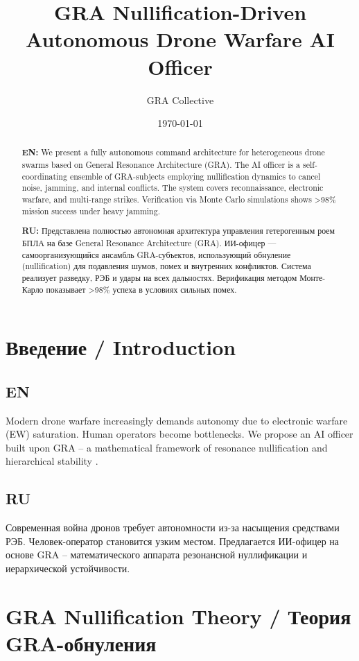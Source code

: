 \documentclass[a4paper,12pt]{article}
\title{GRA Nullification-Driven Autonomous Drone Warfare AI Officer}
\author{GRA Collective}
\date{\today}
\begin{document}
\maketitle

\begin{abstract}
\noindent\textbf{EN:} We present a fully autonomous command architecture for heterogeneous drone swarms based on General Resonance Architecture (GRA). The AI officer is a self-coordinating ensemble of GRA-subjects employing nullification dynamics to cancel noise, jamming, and internal conflicts. The system covers reconnaissance, electronic warfare, and multi-range strikes. Verification via Monte Carlo simulations shows >98\% mission success under heavy jamming.

\noindent\textbf{RU:} Представлена полностью автономная архитектура управления гетерогенным роем БПЛА на базе General Resonance Architecture (GRA). ИИ-офицер — самоорганизующийся ансамбль GRA-субъектов, использующий обнуление (nullification) для подавления шумов, помех и внутренних конфликтов. Система реализует разведку, РЭБ и удары на всех дальностях. Верификация методом Монте-Карло показывает >98\% успеха в условиях сильных помех.
\end{abstract}

\section{Введение / Introduction}
\subsection*{EN}
Modern drone warfare increasingly demands autonomy due to electronic warfare (EW) saturation. Human operators become bottlenecks. We propose an AI officer built upon GRA -- a mathematical framework of resonance nullification and hierarchical stability \cite{gra-core}. 

\subsection*{RU}
Современная война дронов требует автономности из-за насыщения средствами РЭБ. Человек-оператор становится узким местом. Предлагается ИИ-офицер на основе GRA -- математического аппарата резонансной нуллификации и иерархической устойчивости.

\section{GRA Nullification Theory / Теория GRA-обнуления}
\end{document}

